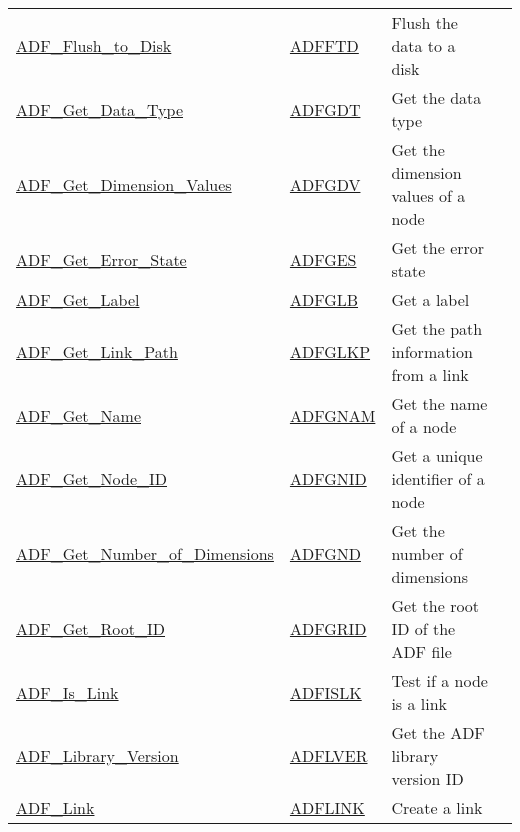 \begin{longtable}{>{\ttfamily}l >{\ttfamily}l >{\raggedright\arraybackslash}p{\Pwidth} c}
\hyperlink{sub:Flush\_to\_Disk}{ADF\_Flush\_to\_Disk} &
   \hyperlink{sub:Flush\_to\_Disk}{ADFFTD} &
   Flush the data to a disk &
   \pageref*{sub:Flush_to_Disk} \\
\hyperlink{sub:Get\_Data\_Type}{ADF\_Get\_Data\_Type} &
   \hyperlink{sub:Get\_Data\_Type}{ADFGDT} &
   Get the data type &
   \pageref*{sub:Get_Data_Type} \\
\hyperlink{sub:Get\_Dimension\_Values}{ADF\_Get\_Dimension\_Values} &
   \hyperlink{sub:Get\_Dimension\_Values}{ADFGDV} &
   Get the dimension values of a node &
   \pageref*{sub:Get_Dimension_Values} \\
\hyperlink{sub:Get\_Error\_State}{ADF\_Get\_Error\_State} &
   \hyperlink{sub:Get\_Error\_State}{ADFGES} &
   Get the error state &
   \pageref*{sub:Get_Error_State} \\
\hyperlink{sub:Get\_Label}{ADF\_Get\_Label} &
   \hyperlink{sub:Get\_Label}{ADFGLB} &
   Get a label &
   \pageref*{sub:Get_Label} \\
\hyperlink{sub:Get\_Link\_Path}{ADF\_Get\_Link\_Path} &
   \hyperlink{sub:Get\_Link\_Path}{ADFGLKP} &
   Get the path information from a link &
   \pageref*{sub:Get_Link_Path} \\
\hyperlink{sub:Get\_Name}{ADF\_Get\_Name} &
   \hyperlink{sub:Get\_Name}{ADFGNAM} &
   Get the name of a node &
   \pageref*{sub:Get_Name} \\
\hyperlink{sub:Get\_Node\_ID}{ADF\_Get\_Node\_ID} &
   \hyperlink{sub:Get\_Node\_ID}{ADFGNID} &
   Get a unique identifier of a node &
   \pageref*{sub:Get_Node_ID} \\
\hyperlink{sub:Get\_Number\_of\_Dimensions}{ADF\_Get\_Number\_of\_Dimensions} &
   \hyperlink{sub:Get\_Number\_of\_Dimensions}{ADFGND} &
   Get the number of dimensions &
   \pageref*{sub:Get_Number_of_Dimensions} \\
\hyperlink{sub:Get\_Root\_ID}{ADF\_Get\_Root\_ID} &
   \hyperlink{sub:Get\_Root\_ID}{ADFGRID} &
   Get the root ID of the ADF file &
   \pageref*{sub:Get_Root_ID} \\
\hyperlink{sub:Is\_Link}{ADF\_Is\_Link} &
   \hyperlink{sub:Is\_Link}{ADFISLK} &
   Test if a node is a link &
   \pageref*{sub:Is_Link} \\
\hyperlink{sub:Library\_Version}{ADF\_Library\_Version} &
   \hyperlink{sub:Library\_Version}{ADFLVER} &
   Get the ADF library version ID &
   \pageref*{sub:Library_Version} \\
\hyperlink{sub:Link}{ADF\_Link} &
   \hyperlink{sub:Link}{ADFLINK} &
   Create a link &
   \pageref*{sub:Link} \\

\end{longtable}
